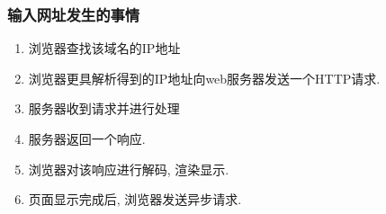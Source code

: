 \subsubsection{输入网址发生的事情}
\begin{enumerate}
	\item 浏览器查找该域名的IP地址
	\item 浏览器更具解析得到的IP地址向web服务器发送一个HTTP请求.
	\item 服务器收到请求并进行处理
	\item 服务器返回一个响应.
	\item 浏览器对该响应进行解码, 渲染显示.
	\item 页面显示完成后, 浏览器发送异步请求.
\end{enumerate}